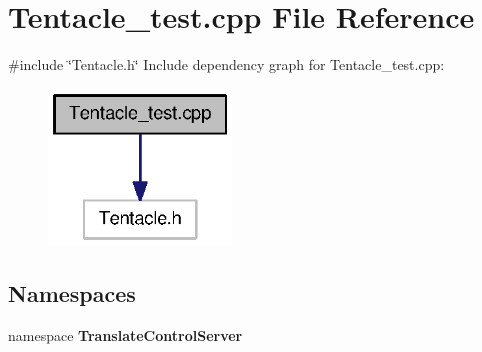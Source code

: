 \section{\-Tentacle\-\_\-test.\-cpp \-File \-Reference}
\label{Tentacle__test_8cpp}
{\ttfamily \#include \char`\"{}\-Tentacle.\-h\char`\"{}}\*
\-Include dependency graph for \-Tentacle\-\_\-test.\-cpp\-:
\nopagebreak
\begin{figure}[H]
\begin{center}
\leavevmode
\includegraphics[width=138pt]{Tentacle__test_8cpp__incl}
\end{center}
\end{figure}
\subsection*{\-Namespaces}
\begin{DoxyCompactItemize}
\item 
namespace {\bf \-Translate\-Control\-Server}
\end{DoxyCompactItemize}
